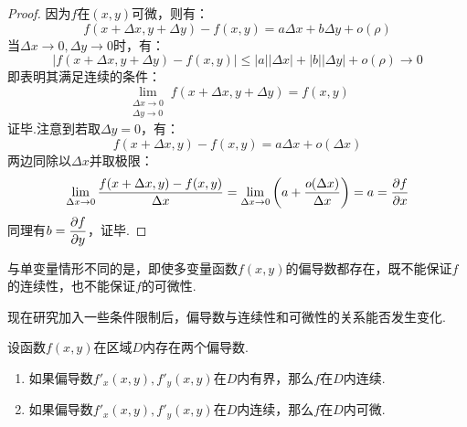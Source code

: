 \begin{proof}
    因为$f$在$(x,y)$可微，则有：
    \[f(x+\Delta x,y+\Delta y) - f(x,y) = a\Delta{x} + b\Delta{y} + o(\rho)\]
    当$\Delta x \to 0,\Delta y \to 0$时，有：
    \[|f(x+\Delta x,y+\Delta y) - f(x,y)| \leqslant |a||\Delta x| + |b||\Delta y| + o(\rho) \to 0\]
    即表明其满足连续的条件：
    \[\lim_{\substack{\Delta x \to 0 \\ \Delta y \to 0}} f(x+\Delta x,y+\Delta y) = f(x,y)\]
    证毕.注意到若取$\Delta y = 0$，有：
    \[f(x+\Delta x,y) - f(x,y) = a\Delta x + o(\Delta x)\]
    两边同除以$\Delta x$并取极限：
    \[\lim_{\Delta x \to 0}\frac{f(x+\Delta x,y)-f(x,y)}{\Delta x} = \lim_{\Delta x \to 0}\left(a+\frac{o(\Delta x)}{\Delta x}\right) = a = \pdv{f}{x}\]
    同理有$\displaystyle b =\pdv{f}{y}$，证毕.
\end{proof}

与单变量情形不同的是，即使多变量函数$f(x,y)$的偏导数都存在，既不能保证$f$的连续性，也不能保证$f$的可微性.

现在研究加入一些条件限制后，偏导数与连续性和可微性的关系能否发生变化.

\begin{theorem}
    设函数$f(x,y)$在区域$D$内存在两个偏导数.
    \begin{enumerate}[circ]
        \item 如果偏导数$f'_x(x,y),f'_y(x,y)$在$D$内有界，那么$f$在$D$内连续.
        \item 如果偏导数$f'_x(x,y),f'_y(x,y)$在$D$内连续，那么$f$在$D$内可微.
    \end{enumerate}
\end{theorem}

